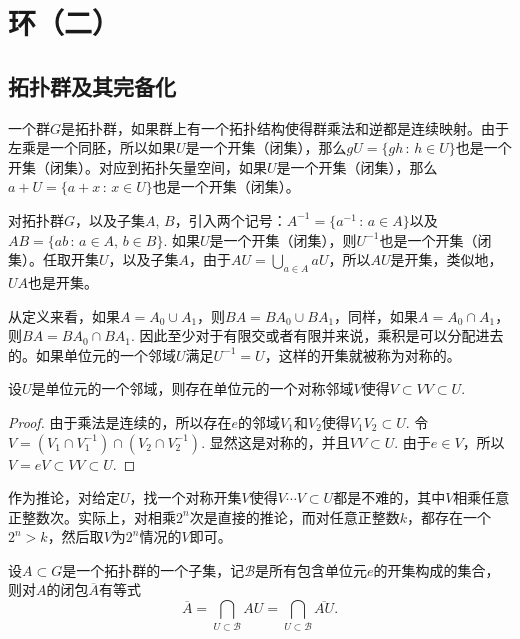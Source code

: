 \chapter{环（二）}

\section{拓扑群及其完备化}

\begin{para}
一个群$G$是拓扑群，如果群上有一个拓扑结构使得群乘法和逆都是连续映射。由于左乘是一个同胚，所以如果$U$是一个开集（闭集），那么$gU=\{gh\,:\,h\in U\}$也是一个开集（闭集）。对应到拓扑矢量空间，如果$U$是一个开集（闭集），那么$a+U=\{a+x\,:\,x\in U\}$也是一个开集（闭集）。

对拓扑群$G$，以及子集$A$, $B$，引入两个记号：$A^{-1}=\{a^{-1}\,:\,a\in A\}$以及$AB=\{ab\,:\,a\in A,\, b\in B\}$. 如果$U$是一个开集（闭集），则$U^{-1}$也是一个开集（闭集）。任取开集$U$，以及子集$A$，由于$AU=\bigcup_{a\in A}aU$，所以$AU$是开集，类似地，$UA$也是开集。

从定义来看，如果$A=A_0\cup A_1$，则$BA=BA_0\cup BA_1$，同样，如果$A=A_0\cap A_1$，则$BA=BA_0\cap BA_1$. 因此至少对于有限交或者有限并来说，乘积是可以分配进去的。如果单位元的一个邻域$U$满足$U^{-1}=U$，这样的开集就被称为对称的。
\end{para}

\begin{lem}
设$U$是单位元的一个邻域，则存在单位元的一个对称邻域$V$使得$V\subset VV\subset U$. 
\end{lem}

\begin{proof}
	由于乘法是连续的，所以存在$e$的邻域$V_1$和$V_2$使得$V_1V_2\subset U$. 令$V=(V_1\cap V_1^{-1})\cap (V_2\cap V_2^{-1})$. 显然这是对称的，并且$VV\subset U$. 由于$e\in V$，所以$V=eV\subset VV\subset U$.
\end{proof}

作为推论，对给定$U$，找一个对称开集$V$使得$V\cdots V\subset U$都是不难的，其中$V$相乘任意正整数次。实际上，对相乘$2^n$次是直接的推论，而对任意正整数$k$，都存在一个$2^n>k$，然后取$V$为$2^n$情况的$V$即可。

\begin{lem}\label{lem:2}
设$A\subset G$是一个拓扑群的一个子集，记$\mathscr{B}$是所有包含单位元$e$的开集构成的集合，则对$A$的闭包$\overline{A}$有等式
\[
	\overline{A}=\bigcap_{U\subset \mathscr{B}}AU=\bigcap_{U\subset \mathscr{B}}\overline{AU}.
\]
\end{lem}

